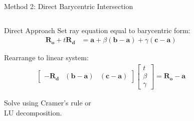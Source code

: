 \begin{frame}{Method 2: Direct Barycentric Intersection}
    \begin{columns}
        \begin{column}{0.65\textwidth}
            \begin{mathbox}{Direct Approach}
                \small
                Set ray equation equal to barycentric form:
                \begin{align*}
                    \mathbf{R_o} + t\mathbf{R_d} &= \mathbf{a} + \beta(\mathbf{b}-\mathbf{a}) + \gamma(\mathbf{c}-\mathbf{a})
                \end{align*}
                
                Rearrange to linear system:
                \begin{align*}
                    \begin{bmatrix}
                        -\mathbf{R_d} & (\mathbf{b}-\mathbf{a}) & (\mathbf{c}-\mathbf{a})
                    \end{bmatrix}
                    \begin{bmatrix}
                        t \\ \beta \\ \gamma
                    \end{bmatrix}
                    = \mathbf{R_o} - \mathbf{a}
                \end{align*}
                
                Solve using Cramer's rule or \\ LU decomposition.
            \end{mathbox}
        \end{column}
        \begin{column}{0.35\textwidth}
\end{column}
\end{columns}
\end{frame}
